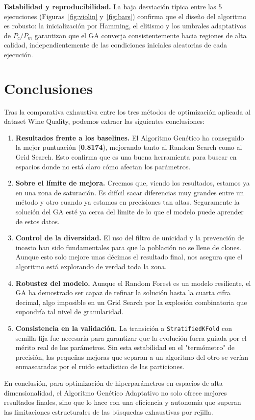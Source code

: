 \documentclass[12pt, a4paper]{article}
\begin{document}
\textbf{Estabilidad y reproducibilidad.} La baja desviación típica entre las 5
ejecuciones (Figuras~\ref{fig:violin} y~\ref{fig:bars}) confirma que el diseño del
algoritmo es robusto: la inicialización por Hamming, el elitismo y los umbrales
adaptativos de $P_c/P_m$ garantizan que el GA converja consistentemente hacia regiones
de alta calidad, independientemente de las condiciones iniciales aleatorias de cada
ejecución.

\section{Conclusiones}

Tras la comparativa exhaustiva entre los tres métodos de optimización aplicada al dataset
Wine Quality, podemos extraer las siguientes conclusiones:

\begin{enumerate}[itemsep=0.3em]
  \item \textbf{Resultados frente a los baselines.} El Algoritmo Genético ha conseguido
        la mejor puntuación (\textbf{0.8174}), mejorando tanto al Random Search
        como al Grid Search. Esto confirma que es una buena herramienta para buscar
        en espacios donde no está claro cómo afectan los parámetros.

  \item \textbf{Sobre el límite de mejora.} Creemos que, viendo los resultados, estamos 
        ya en una zona de saturación. Es difícil sacar diferencias muy grandes entre 
        un método y otro cuando ya estamos en precisiones tan altas. Seguramente la
        solución del GA esté ya cerca del límite de lo que el modelo puede aprender de 
        estos datos.

  \item \textbf{Control de la diversidad.} El uso del filtro de unicidad y la prevención 
        de incesto han sido fundamentales para que la población no se llene de clones.
        Aunque esto solo mejore unas décimas el resultado final, nos asegura que el
        algoritmo está explorando de verdad toda la zona.

  \item \textbf{Robustez del modelo.} Aunque el Random Forest es un modelo resiliente,
        el GA ha demostrado ser capaz de refinar la solución hasta la cuarta cifra
        decimal, algo imposible en un Grid Search por la explosión combinatoria que
        supondría tal nivel de granularidad.

  \item \textbf{Consistencia en la validación.} La transición a \texttt{StratifiedKFold}
        con semilla fija fue necesaria para garantizar que la evolución fuera guiada por
        el mérito real de los parámetros. Sin esta estabilidad en el "termómetro" de
        precisión, las pequeñas mejoras que separan a un algoritmo del otro se verían
        enmascaradas por el ruido estadístico de las particiones.
\end{enumerate}

En conclusión, para optimización de hiperparámetros en espacios de alta dimensionalidad, el
Algoritmo Genético Adaptativo no solo ofrece mejores resultados finales, sino que lo hace
con una eficiencia y autonomía que superan las limitaciones estructurales de las búsquedas
exhaustivas por rejilla.
\end{document}
